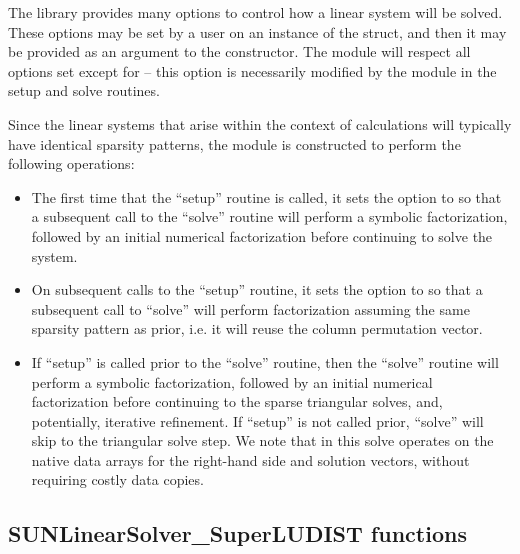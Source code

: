 The {\superludist} library provides many options to control how a linear
system will be solved. These options may be set by a user on an instance
of the  struct, and then it may be provided
as an argument to the {\sunlinsolsludist} constructor. The {\sunlinsolsludist}
module will respect all options set except for  -- this option is
necessarily modified by the {\sunlinsolsludist} module in the setup and solve routines.

Since the linear systems that arise within the context of {\sundials}
calculations will typically have identical sparsity patterns, the
{\sunlinsolsludist} module is constructed to perform the
following operations:
\begin{itemize}
\item The first time that the ``setup'' routine is called, it
  sets the {\superludist} option  to  so that a subsequent
  call to the ``solve'' routine will perform a symbolic factorization,
  followed by an initial numerical factorization before continuing
  to solve the system.
\item On subsequent calls to the ``setup'' routine, it sets the
  {\superludist} option  to  so that
  a subsequent call to ``solve'' will perform factorization assuming
  the same sparsity pattern as prior, i.e. it will reuse the column
  permutation vector.
\item If ``setup'' is called prior to the ``solve'' routine, then the ``solve''
  routine will perform a symbolic factorization, followed by an initial
  numerical factorization before continuing to the sparse triangular
  solves, and, potentially, iterative refinement. If ``setup'' is not
  called prior, ``solve'' will skip to the triangular solve step. We
  note that in this solve {\superludist} operates on the native data arrays
  for the right-hand side and solution vectors, without requiring costly data copies.
\end{itemize}


\subsection{SUNLinearSolver\_SuperLUDIST functions}\label{ss:sunlinsol_sludist_functions}

